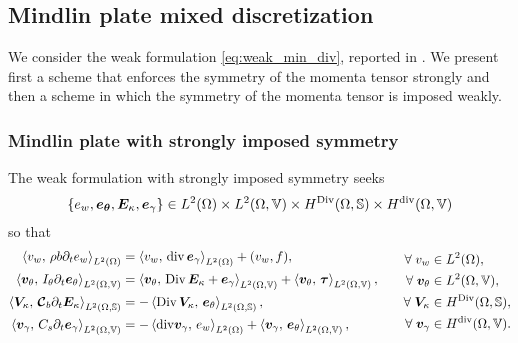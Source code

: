 \subsection{Mindlin plate mixed discretization}
We consider the weak formulation \eqref{eq:weak_min_div}, reported in . We present first a scheme that enforces the symmetry of the momenta tensor strongly and then a scheme in which the symmetry of the momenta tensor is imposed weakly.

\subsubsection{Mindlin plate with strongly imposed symmetry}\label{sec:min_strong}
The weak formulation with strongly imposed symmetry seeks 
$$\{e_w, \bm{e}_{\bm{\theta}}, \bm{E}_{\kappa}, \bm{e}_{\gamma}\} \in L^2(\Omega) \times L^2(\Omega, \mathbb{V}) \times H^{\operatorname*{Div}}(\Omega, \mathbb{S}) \times H^{\operatorname{div}}(\Omega, \mathbb{V})$$
 so that 
\begin{equation}
\label{eq:weak_min_div_strong}
\begin{aligned}
\inner[L^2(\Omega)]{v_w}{\rho b \partial_t {e}_w} &= \inner[L^2(\Omega)]{v_w}{\div \bm{e}_\gamma} + (v_w, f), \\ 
\inner[L^2(\Omega, \mathbb{V})]{\bm{v}_\theta}{I_\theta \partial_t {\bm{e}}_\theta} &= \inner[L^2(\Omega, \mathbb{V})]{\bm{v}_\theta}{\Div \bm{E}_\kappa + \bm{e}_\gamma} + \inner[L^2(\Omega, \mathbb{V})]{\bm{v}_\theta}{\bm{\tau}}, \\  
\inner[L^2(\Omega, \mathbb{S})]{\bm{V}_\kappa}{\bm{\mathcal{C}}_{b} \partial_t{\bm{E}}_\kappa} &= -\inner[L^2(\Omega, \mathbb{S})]{\Div \bm{V}_\kappa}{\bm{e}_\theta}, \\ 
\inner[L^2(\Omega, \mathbb{V})]{\bm{v}_\gamma}{C_s \partial_t{\bm{e}}_\gamma} &= -\inner[L^2(\Omega)]{\mathrm{div} \bm{v}_\gamma}{e_w} + \inner[L^2(\Omega, \mathbb{V})]{\bm{v}_\gamma}{\bm{e}_{\theta}}, \\ 
\end{aligned} \qquad
\begin{aligned}
\forall\; v_w &\in L^2(\Omega), \\
\forall\; \bm{v}_\theta &\in L^2(\Omega, \mathbb{V}), \\
\forall\; \bm{V}_\kappa &\in H^{\Div}(\Omega, \mathbb{S}), \\
\forall\; \bm{v}_\gamma &\in H^{\div}(\Omega, \mathbb{V}).
\end{aligned}
\end{equation}

